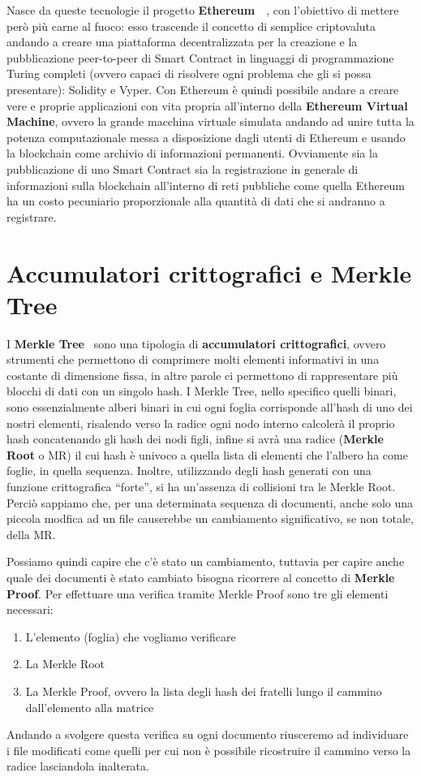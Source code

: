 \label{sub:eth}
Nasce da queste tecnologie il progetto \textbf{Ethereum}~\cite{eth-21}~\cite{eth-22}, con l’obiettivo di mettere però
più carne al fuoco: esso trascende il concetto di semplice criptovaluta andando a creare
una piattaforma decentralizzata per la creazione e la pubblicazione peer-to-peer di Smart Contract
in linguaggi di programmazione Turing completi (ovvero capaci di risolvere ogni problema
che gli si possa presentare): Solidity e Vyper.
Con Ethereum è quindi possibile andare a creare vere e proprie applicazioni
con vita propria all’interno della \textbf{Ethereum Virtual Machine},
ovvero la grande macchina virtuale simulata andando ad unire tutta la potenza computazionale
messa a disposizione dagli utenti di Ethereum e usando la blockchain come archivio di
informazioni permanenti. Ovviamente sia la pubblicazione di uno Smart Contract sia la registrazione
in generale di informazioni sulla blockchain all’interno di reti pubbliche come quella
Ethereum ha un costo pecuniario proporzionale alla quantità di dati che si andranno a registrare.

\section{Accumulatori crittografici e Merkle Tree}
\label{sub:mt}
I \textbf{Merkle Tree}~\cite{mertree} sono una tipologia di \textbf{accumulatori crittografici}, ovvero strumenti che permettono
di comprimere molti elementi informativi in una costante di dimensione fissa, in altre parole
ci permettono di rappresentare più blocchi di dati con un singolo hash.
I Merkle Tree, nello specifico quelli binari, sono essenzialmente alberi binari
in cui ogni foglia corrisponde all’hash di uno dei nostri elementi, risalendo verso la radice ogni
nodo interno calcolerà il proprio hash concatenando gli hash dei nodi figli, infine si avrà
una radice (\textbf{Merkle Root} o MR) il cui hash è univoco a quella lista di elementi che l’albero
ha come foglie, in quella sequenza.
Inoltre, utilizzando degli hash generati con una funzione crittografica “forte”, si ha
un’assenza di collisioni tra le Merkle Root.
Perciò sappiamo che, per una determinata sequenza di documenti, anche solo una
piccola modfica ad un file causerebbe un cambiamento significativo, se non totale, della MR.

Possiamo quindi capire che c’è stato un cambiamento, tuttavia per capire anche
quale dei documenti è stato cambiato bisogna ricorrere al concetto di \textbf{Merkle Proof}.
Per effettuare una verifica tramite Merkle Proof sono tre gli elementi necessari:
\begin{enumerate}
    \item L’elemento (foglia) che vogliamo verificare
    \item La Merkle Root
    \item La Merkle Proof, ovvero la lista degli hash dei fratelli lungo il cammino dall’elemento alla matrice
\end{enumerate}
Andando a svolgere questa verifica su ogni documento riusceremo ad individuare i file modificati come
quelli per cui non è possibile ricostruire il cammino verso la radice lasciandola inalterata.

